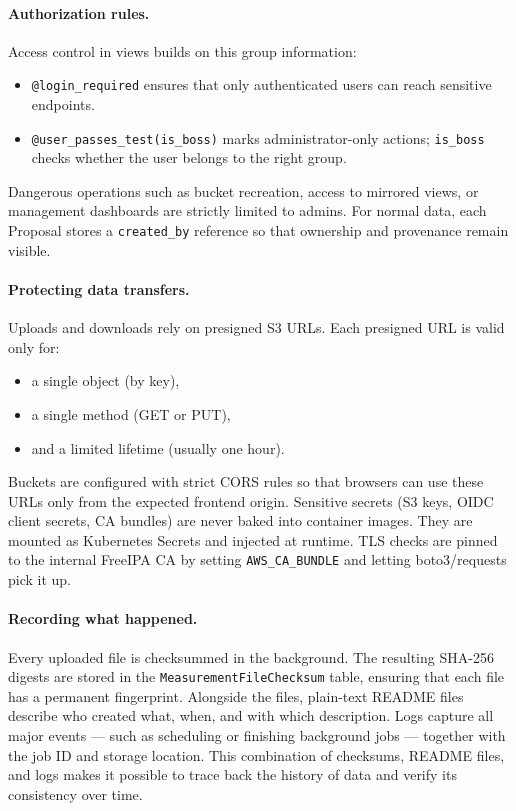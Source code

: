 \paragraph{Authorization rules.}
Access control in views builds on this group information:
\begin{itemize}
	\item \texttt{@login\_required} ensures that only authenticated users 
	can reach sensitive endpoints.  
	\item \texttt{@user\_passes\_test(is\_boss)} marks administrator-only 
	actions; \texttt{is\_boss} checks whether the user belongs to the right group.  
\end{itemize}
Dangerous operations such as bucket recreation, access to mirrored views, 
or management dashboards are strictly limited to admins.  
For normal data, each Proposal stores a \texttt{created\_by} reference 
so that ownership and provenance remain visible.

\paragraph{Protecting data transfers.}
Uploads and downloads rely on presigned S3 URLs.  
Each presigned URL is valid only for:
\begin{itemize}
	\item a single object (by key),  
	\item a single method (GET or PUT),  
	\item and a limited lifetime (usually one hour).  
\end{itemize}
Buckets are configured with strict CORS rules so that browsers can use these 
URLs only from the expected frontend origin.  
Sensitive secrets (S3 keys, OIDC client secrets, CA bundles) are never baked 
into container images. They are mounted as Kubernetes Secrets and injected at 
runtime. TLS checks are pinned to the internal FreeIPA CA by setting 
\texttt{AWS\_CA\_BUNDLE} and letting boto3/requests pick it up.

\paragraph{Recording what happened.}
Every uploaded file is checksummed in the background.  
The resulting SHA-256 digests are stored in the 
\texttt{MeasurementFileChecksum} table, ensuring that each file has a 
permanent fingerprint.  
Alongside the files, plain-text README files describe who created what, when, 
and with which description.  
Logs capture all major events — such as scheduling or finishing background 
jobs — together with the job ID and storage location.  
This combination of checksums, README files, and logs makes it possible 
to trace back the history of data and verify its consistency over time.


